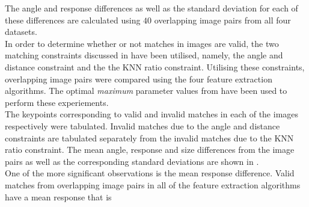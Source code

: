 \documentclass{article}
\begin{document}
The angle and response differences as well as the standard deviation for each of these differences are calculated using $40$ overlapping image pairs from all four datasets.\\
In order to determine whether or not matches in images are valid, the two matching constraints discussed in  have been utilised, namely, the angle and distance constraint and the the KNN ratio constraint. Utilising these constraints, overlapping image pairs were compared using the four feature extraction algorithms. The optimal \textit{maximum} parameter values from  have been used to perform these experiements. \\

The keypoints corresponding to valid and invalid matches in each of the images respectively were tabulated. Invalid matches due to the angle and distance constraints are tabulated separately from the invalid matches due to the KNN ratio constraint. The mean angle, response and size differences from the image pairs as well as the corresponding standard deviations are shown in .\\

One of the more significant observations is the mean response difference. Valid matches from overlapping image pairs in all of the feature extraction algorithms have a mean response that is 

\end{document}
